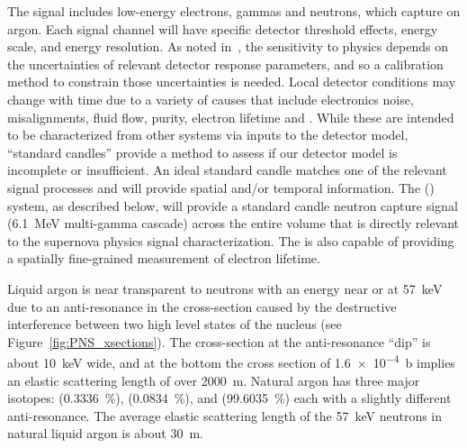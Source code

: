 


The  signal includes low-energy  electrons, gammas and neutrons, %
which capture on argon. Each signal channel will have specific detector threshold effects, energy scale, and energy resolution. 
As noted in~\physchsnb, 
the sensitivity to  physics 
depends on the uncertainties of relevant detector response parameters, and so a calibration method to constrain those uncertainties is needed.
Local detector conditions may change with time due to a variety of 
causes that include electronics noise, misalignments, fluid flow,  purity, electron lifetime and \efield. While these are intended to be characterized from other systems via inputs to the detector model, ``standard candles'' provide a method to assess if our detector model is incomplete or insufficient. An ideal standard candle matches one of the relevant signal processes and will provide spatial and/or temporal information. The  () system, as described below, will provide a standard candle neutron capture signal (\SI{6.1}{\MeV} multi-gamma cascade) across the entire  volume that is directly relevant to the supernova physics signal characterization. The  is also capable of providing a spatially fine-grained measurement of electron lifetime. 



Liquid argon is near transparent to neutrons with an energy near or at \SI{57}{\keV} due to an anti-resonance in the cross-section caused by the destructive interference between two high level states of the  nucleus (see Figure~\ref{fig:PNS_xsections}). The cross-section at the anti-resonance ``dip'' is about \SI{10}{\keV} wide, and at the bottom the cross section of \SI{1.6e-4}{\barn} implies an elastic scattering length of over \SI{2000}{\m}. %
Natural argon has three major isotopes:  (\SI{0.3336}{\%}),  (\SI{0.0834}{\%}), and  (\SI{99.6035}{\%}) each with a slightly different anti-resonance. The average elastic scattering length of the \SI{57}{\keV} neutrons in natural liquid argon is about \SI{30}{\m}.

